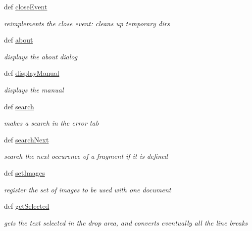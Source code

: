 \begin{DoxyCompactItemize}
\item 
def \hyperlink{classuicilibris_1_1w2mMainWindow_a00095aa6235477d728057cf9d7d6221a}{close\-Event}
\begin{DoxyCompactList}\small\item\em reimplements the close event\-: cleans up temporary dirs \end{DoxyCompactList}\item 
def \hyperlink{classuicilibris_1_1w2mMainWindow_a30da63be175a0f4c8f942b25c7092d60}{about}
\begin{DoxyCompactList}\small\item\em displays the about dialog \end{DoxyCompactList}\item 
def \hyperlink{classuicilibris_1_1w2mMainWindow_a9e24390ca18a0b41afa56c6b24f7d06b}{display\-Manual}
\begin{DoxyCompactList}\small\item\em displays the manual \end{DoxyCompactList}\item 
def \hyperlink{classuicilibris_1_1w2mMainWindow_a0e9674456559e4ae92ade2c99cf93d7b}{search}
\begin{DoxyCompactList}\small\item\em makes a search in the error tab \end{DoxyCompactList}\item 
def \hyperlink{classuicilibris_1_1w2mMainWindow_a588c437ad13c0313a23eda4d4fbe6334}{search\-Next}
\begin{DoxyCompactList}\small\item\em search the next occurence of a fragment if it is defined \end{DoxyCompactList}\item 
def \hyperlink{classuicilibris_1_1w2mMainWindow_a1a1b41e898d650d99ee9de7c0f423ac8}{set\-Images}
\begin{DoxyCompactList}\small\item\em register the set of images to be used with one document \end{DoxyCompactList}\item 
def \hyperlink{classuicilibris_1_1w2mMainWindow_a44b374bc853c2903372e4a0d421929a3}{get\-Selected}
\begin{DoxyCompactList}\small\item\em gets the text selected in the drop area, and converts eventually all the line breaks \end{DoxyCompactList}\item 

\end{DoxyCompactItemize}
